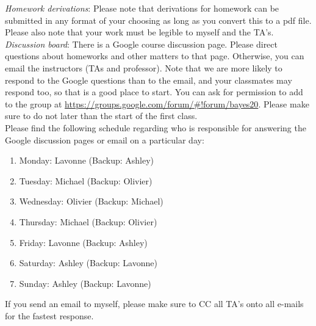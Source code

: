 \documentclass[11pt]{article}
\begin{document}
\emph{Homework derivations}: Please note that derivations for homework can be submitted in any format of your choosing as long as you convert this to a pdf file. Please also note that your work must be legible to myself and the TA's. \\


\emph{Discussion board}:
There is a Google course discussion page. Please direct questions about homeworks and other matters to that page. Otherwise, you can email the instructors (TAs and professor). Note that we are more likely to respond to the Google questions than to the email, and your classmates may respond too, so that is a good place to start. You can ask for permission to add to the group at \url{https://groups.google.com/forum/#!forum/bayes20}. Please make sure to do not later than the start of the first class.\\


Please find the following schedule regarding who is responsible for answering the Google discussion pages or email on a particular day:

\begin{enumerate}
\item Monday: Lavonne (Backup: Ashley)
\item Tuesday: Michael (Backup: Olivier)
\item Wednesday: Olivier (Backup: Michael)
\item Thursday: Michael (Backup: Olivier)
\item Friday: Lavonne (Backup: Ashley)
\item Saturday: Ashley (Backup: Lavonne)
\item Sunday: Ashley (Backup: Lavonne)
\end{enumerate}

If you send an email to myself, please make sure to CC all TA's onto all e-mails for the fastest response.\\
\end{document}
